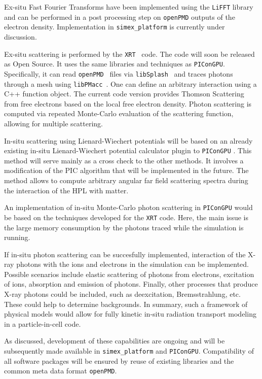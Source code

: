 \documentclass[a4paper]{article}
\begin{document}
Ex-situ Fast Fourier Transforms have been implemented using the \texttt{LiFFT} library \cite{liblifft_github} and can be performed in a post processing step on \texttt{openPMD} outputs of the electron density. Implementation in \texttt{simex\_platform} is currently under discussion.

Ex-situ scattering is performed by the \texttt{XRT}~\cite{xrt_github} code. The code will soon be released as Open Source. It uses the same libraries and techniques as \texttt{PIConGPU}. Specifically, it can read \texttt{openPMD}~\cite{openPMD} files via \texttt{libSplash}~\cite{libSplash_github} and traces photons through a mesh using \texttt{libPMacc}~\cite{picongpu_github}. One can define an arbitrary interaction using a C++ function object. The current code version provides Thomson Scattering from free electrons based on the local free electron density. Photon scattering is computed via repeated Monte-Carlo evaluation of the scattering function, allowing for multiple scattering.

In-situ scattering using Lienard-Wiechert potentials will be based on an already existing in-situ Lienard-Wiechert potential calculator plugin to \texttt{PIConGPU} \cite{Pausch2013}. This method will serve mainly as a cross check to the other methods. It involves a modification of the PIC algorithm that will be implemented in the future. The method allows to compute arbitrary angular far field scattering spectra during the interaction of the HPL with matter.

An implementation of in-situ Monte-Carlo photon scattering in \texttt{PIConGPU} would be based on the techniques developed for the \texttt{XRT} code. Here, the main issue is the large memory consumption by the photons traced while the simulation is running. 

If in-situ photon scattering can be succesfully implemented, interaction of the X-ray photons with the ions and electrons in the simulation can be implemented. Possible scenarios include elastic scattering of photons from electrons, excitation of ions, absorption and emission of photons. Finally, other processes that produce X-ray photons could be included, such as deexcitation, Bremsstrahlung, etc. These could help to determine backgrounds. In summary, such a framework of physical models would allow for fully kinetic in-situ radiation transport modeling in a particle-in-cell code.

As discussed, development of these capabilities are ongoing and will be subsequently made available in \texttt{simex\_platform} and \texttt{PIConGPU}. Compatibility of all software packages will be ensured by reuse of existing libraries and the common meta data format \texttt{openPMD}.
\end{document}
